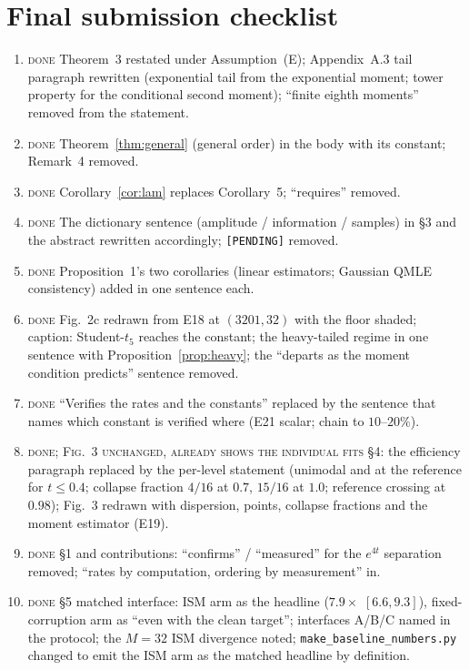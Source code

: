 \section{Final submission checklist}
\label{sec:checklist}

\begin{enumerate}[label=$\square$, leftmargin=1.6em]
\item \textsc{done} Theorem~3 restated under Assumption~(E); Appendix~A.3 tail paragraph rewritten (exponential tail from the exponential moment; tower property for the conditional second moment); ``finite eighth moments'' removed from the statement.
\item \textsc{done} Theorem~\ref{thm:general} (general order) in the body with its constant; Remark~4 removed.
\item \textsc{done} Corollary~\ref{cor:lam} replaces Corollary~5; ``requires'' removed.
\item \textsc{done} The dictionary sentence (amplitude / information / samples) in \S3 and the abstract rewritten accordingly; \texttt{[PENDING]} removed.
\item \textsc{done} Proposition~1's two corollaries (linear estimators; Gaussian QMLE consistency) added in one sentence each.
\item \textsc{done} Fig.~2c redrawn from E18 at $(3201,32)$ with the floor shaded; caption: Student-$t_5$ reaches the constant; the heavy-tailed regime in one sentence with Proposition~\ref{prop:heavy}; the ``departs as the moment condition predicts'' sentence removed.
\item \textsc{done} ``Verifies the rates and the constants'' replaced by the sentence that names which constant is verified where (E21 scalar; chain to $10$--$20\%$).
\item \textsc{done; Fig.~3 unchanged, already shows the individual fits} \S4: the efficiency paragraph replaced by the per-level statement (unimodal and at the reference for $t\le0.4$; collapse fraction $4/16$ at $0.7$, $15/16$ at $1.0$; reference crossing at $0.98$); Fig.~3 redrawn with dispersion, points, collapse fractions and the moment estimator (E19).
\item \textsc{done} \S1 and contributions: ``confirms'' / ``measured'' for the $e^{4t}$ separation removed; ``rates by computation, ordering by measurement'' in.
\item \textsc{done} \S5 matched interface: ISM arm as the headline ($7.9\times$ $[6.6,9.3]$), fixed-corruption arm as ``even with the clean target''; interfaces A/B/C named in the protocol; the $M=32$ ISM divergence noted; \texttt{make\_baseline\_numbers.py} changed to emit the ISM arm as the matched headline by definition.

\end{enumerate}
